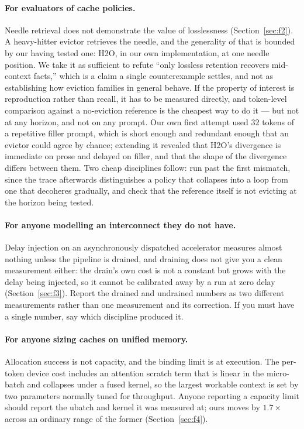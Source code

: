 \documentclass[manuscript,anonymous,review]{acmart}
\begin{document}
\paragraph{For evaluators of cache policies.} Needle retrieval does not
demonstrate the value of losslessness (Section~\ref{sec:f2}). A
heavy-hitter evictor retrieves the needle, and the generality of that
is bounded by our having tested one: H2O, in our own implementation, at
one needle position. We take it as sufficient to refute
``only lossless retention recovers mid-context facts,'' which is a
claim a single counterexample settles, and not as
establishing how eviction families in general behave. If the property of interest is
reproduction rather than recall, it has to be measured directly, and
token-level comparison against a no-eviction reference is the cheapest
way to do it --- but not at any horizon, and not on any prompt. Our own
first attempt used $32$ tokens of a repetitive filler prompt, which is
short enough and redundant enough that an evictor could agree by
chance; extending it revealed that H2O's divergence is immediate on
prose and delayed on filler, and that the shape of the divergence
differs between them. Two cheap disciplines follow: run past the first
mismatch, since the trace afterwards distinguishes a policy that
collapses into a loop from one that decoheres gradually, and check that
the reference itself is not evicting at the horizon being tested.

\paragraph{For anyone modelling an interconnect they do not have.}
Delay injection on an asynchronously dispatched accelerator measures
almost nothing unless the pipeline is drained, and draining does not
give you a clean measurement either: the drain's own cost is not a
constant but grows with the delay being injected, so it cannot be
calibrated away by a run at zero delay (Section~\ref{sec:f3}). Report
the drained and undrained numbers as two different measurements rather
than one measurement and its correction. If you must have a single
number, say which discipline produced it.

\paragraph{For anyone sizing caches on unified memory.} Allocation
success is not capacity, and the binding limit is at execution. The
per-token device cost includes an attention scratch term that is linear
in the micro-batch and collapses under a fused kernel, so the largest
workable context is set by two parameters normally tuned for
throughput. Anyone reporting a capacity limit should report the ubatch
and kernel it was measured at; ours moves by $1.7\times$ across an
ordinary range of the former (Section~\ref{sec:f4}).
\end{document}
